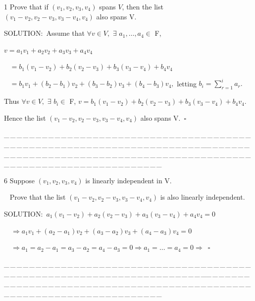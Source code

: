 \documentclass[a4paper, 11pt, UTF8]{article}
\begin{document}
\begin{large}
{\timesbf\Large 1} {\timessl\Large 
Prove that if $(v_1,v_2,v_3,v_4)$ spans $V$, then the list
$(v_1-v_2,v_2-v_3,v_3-v_4,v_4)$ also spans V.
}\par
{\timesbf S\footnotesize{OLUTION:}}\,\,\,Assume that $\forall v\in V,\,\,\exists\,\,a_1,\dots,a_4\in$ {\timesbf F},\par\qquad
$v=a_1 v_1+a_2 v_2+a_3 v_3+a_4 v_4$\par\qquad\,\,\,
$=b_1(v_1-v_2)+b_2(v_2-v_3)+b_3(v_3-v_4)+b_4 v_4$\par\qquad\,\,\,
$=b_1 v_1+(b_2-b_1)v_2+(b_3-b_2)v_3+(b_4-b_3)v_4,$ letting $b_i=\sum\limits_{r=1}^i a_r.$\par\quad
Thus $\forall v\in V,\,\,\exists\,\,b_i\in$ {\timesbf F}, $v=b_1 (v_1-v_2)+b_2(v_2-v_3)+b_3(v_3-v_4)+b_4 v_4.$\par\quad
Hence the list $(v_1-v_2,v_2-v_3,v_3-v_4,v_4)$ also spans V.$\,\,\,\square$
\par
{\tiny \_\,\_\,\_\,\_\,\_\,\_\,\_\,\_\,\_\,\_\,\_\,\_\,\_\,\_\,\_\,\_\,\_\,\_\,\_\,\_\,\_\,\_\,\_\,\_\,\_\,\_\,\_\,\_\,\_\,\_\,\_\,\_\,\_\,\_\,\_\,\_\,\_\,\_\,\_\,\_\,\_\,\_\,\_\,\_\,\_\,\_\,\_\,\_\,\_\,\_\,\_\,\_\,\_\,\_\,\_\,\_\,\_\,\_\,\_\,\_\,\_\,\_\,\_\,\_\,\_\,\_\,\_\,\_\,\_\,\_\,\_\_\,\_\,\_\,\_\,\_\,\_\,\_\,\_\,\_\,\_\,\_\,\_\,\_\,\_\,\_\,\_\,\_\,\_\,\_\,\_\,\_\,\_\,\_\,\_\,\_\,\_\,\_\,\_\,\_\,\_\,\_\,\_\,\_\,\_\,\_\,\_\,\_\,\_\,\_\,\_\,\_\,\_\,\_\,\_\,\_\,\_\,\_\,\_\,\_\,\_\,\_\,\_\,\_\,\_\,\_\,\_\,\_\,\_\,\_\,\_\,\_\,\_\,\_\,\_\,\_\,\_\,\_\,\_\,\_\,\_\,\_}\par

{\timesbf\Large 6} {\timessl\Large 
Suppose $(v_1,v_2,v_3,v_4)$ is linearly independent in V.}\par\,\,\,
{\timessl\Large Prove that the list $(v_1-v_2,v_2-v_3,v_3-v_4,v_4)$ is also linearly independent.
}\par
{\timesbf S\footnotesize{OLUTION:}}\,\,\,$a_1(v_1-v_2)+a_2(v_2-v_3)+a_3(v_3-v_4)+a_4 v_4=0$\par\qquad\quad\,\,\,\,
$\Rightarrow a_1 v_1+(a_2-a_1)v_2+(a_3-a_2)v_3+(a_4-a_3)v_4=0$\par\quad\qquad\,\,\,\,
$\Rightarrow a_1=a_2-a_1=a_3-a_2=a_4-a_3=0\Rightarrow a_1=\dots=a_4=0\Rightarrow\,\,\,\square$
\par
{\tiny \_\,\_\,\_\,\_\,\_\,\_\,\_\,\_\,\_\,\_\,\_\,\_\,\_\,\_\,\_\,\_\,\_\,\_\,\_\,\_\,\_\,\_\,\_\,\_\,\_\,\_\,\_\,\_\,\_\,\_\,\_\,\_\,\_\,\_\,\_\,\_\,\_\,\_\,\_\,\_\,\_\,\_\,\_\,\_\,\_\,\_\,\_\,\_\,\_\,\_\,\_\,\_\,\_\,\_\,\_\,\_\,\_\,\_\,\_\,\_\,\_\,\_\,\_\,\_\,\_\,\_\,\_\,\_\,\_\,\_\,\_\_\,\_\,\_\,\_\,\_\,\_\,\_\,\_\,\_\,\_\,\_\,\_\,\_\,\_\,\_\,\_\,\_\,\_\,\_\,\_\,\_\,\_\,\_\,\_\,\_\,\_\,\_\,\_\,\_\,\_\,\_\,\_\,\_\,\_\,\_\,\_\,\_\,\_\,\_\,\_\,\_\,\_\,\_\,\_\,\_\,\_\,\_\,\_\,\_\,\_\,\_\,\_\,\_\,\_\,\_\,\_\,\_\,\_\,\_\,\_\,\_\,\_\,\_\,\_\,\_\,\_\,\_\,\_\,\_\,\_\,\_}\par


\end{large}
\end{document}
